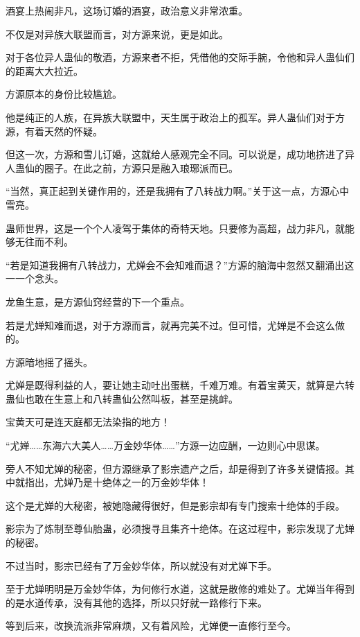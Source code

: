 
\begin{this_body}

酒宴上热闹非凡，这场订婚的酒宴，政治意义非常浓重。

不仅是对异族大联盟而言，对方源来说，更是如此。

对于各位异人蛊仙的敬酒，方源来者不拒，凭借他的交际手腕，令他和异人蛊仙们的距离大大拉近。

方源原本的身份比较尴尬。

他是纯正的人族，在异族大联盟中，天生属于政治上的孤军。异人蛊仙们对于方源，有着天然的怀疑。

但这一次，方源和雪儿订婚，这就给人感观完全不同。可以说是，成功地挤进了异人蛊仙的圈子。在此之前，方源只是融入琅琊派而已。

“当然，真正起到关键作用的，还是我拥有了八转战力啊。”关于这一点，方源心中雪亮。

蛊师世界，这是一个个人凌驾于集体的奇特天地。只要修为高超，战力非凡，就能够无往而不利。

“若是知道我拥有八转战力，尤婵会不会知难而退？”方源的脑海中忽然又翻涌出这一一个念头。

龙鱼生意，是方源仙窍经营的下一个重点。

若是尤婵知难而退，对于方源而言，就再完美不过。但可惜，尤婵是不会这么做的。

方源暗地摇了摇头。

尤婵是既得利益的人，要让她主动吐出蛋糕，千难万难。有着宝黄天，就算是六转蛊仙也敢在生意上和八转蛊仙公然叫板，甚至是挑衅。

宝黄天可是连天庭都无法染指的地方！

“尤婵……东海六大美人……万金妙华体……”方源一边应酬，一边则心中思谋。

旁人不知尤婵的秘密，但方源继承了影宗遗产之后，却是得到了许多关键情报。其中就指出，尤婵乃是十绝体之一的万金妙华体！

这个是尤婵的大秘密，被她隐藏得很好，但是影宗却有专门搜索十绝体的手段。

影宗为了炼制至尊仙胎蛊，必须搜寻且集齐十绝体。在这过程中，影宗发现了尤婵的秘密。

不过当时，影宗已经有了万金妙华体，所以就没有对尤婵下手。

至于尤婵明明是万金妙华体，为何修行水道，这就是散修的难处了。尤婵当年得到的是水道传承，没有其他的选择，所以只好就一路修行下来。

等到后来，改换流派非常麻烦，又有着风险，尤婵便一直修行至今。


\end{this_body}
